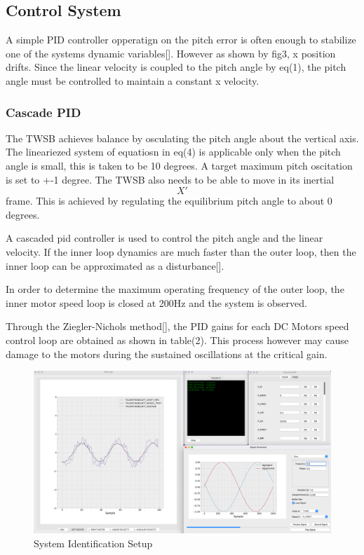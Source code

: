     \subsection{Control System}
       
        A simple PID controller opperatign on the pitch error is often enough to stabilize one of the systems dynamic variables[].
        However as shown by fig3, x position drifts. Since the linear velocity is coupled to the
        pitch angle by eq(1), the pitch angle must be controlled to maintain a constant x velocity. 

        \subsubsection{Cascade PID}

        The TWSB achieves balance by osculating the pitch angle about the vertical axis. 
        The lineariezed system of equatiosn in eq(4) is applicable 
        only when the pitch angle is small, this is taken to be 10 degrees. 
        A target maximum pitch oscitation is set to +-1 degree. 
        The TWSB also needs to be able to move in its inertial $$X'$$ frame.
        This is achieved by regulating the equilibrium pitch angle to about 0 degrees.

        A cascaded pid controller is used to control the pitch angle and the linear velocity. 
        If the inner loop dynamics are much faster than the outer loop, 
        then the inner loop can be approximated as a disturbance[].

        In order to determine the maximum operating frequency of the outer loop, 
        the inner motor speed loop is closed at 200Hz and the system is observed.
        
        Through the Ziegler-Nichols method[], the PID gains for each DC Motors speed control loop 
        are obtained as shown in table(2). This process however may cause damage to the motors 
        during the sustained oscillations at the critical gain. 
       
        \begin{figure}[H]
            \includegraphics[width=\textwidth]{SysIDMotorSetUp.png}
            \caption{System Identification Setup}
        \end{figure}
        
